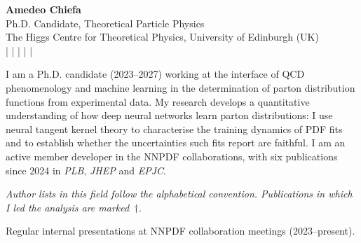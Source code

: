 \documentclass[10pt,a4paper]{article}
\begin{document}
\begin{center}
    {\LARGE \textbf{Amedeo Chiefa}} \\[0.1cm]
    {\large Ph.D. Candidate, Theoretical Particle Physics} \\
    \vspace{0.15cm}
    \small
    The Higgs Centre for Theoretical Physics, University of Edinburgh (UK) \\
    \vspace{0.15cm}
    \cvemaillink{} |
    \cvlinkedin{} |
    \cvgithub{} |
    \inspirehep{} |
    \googlescholar{} |
    \cvorcid
    \normalsize
\end{center}

\begin{cvlist}
  \item[] I am a Ph.D. candidate (2023--2027) working at the interface of QCD
          phenomenology and machine learning in the determination of parton
          distribution functions from experimental data. My research develops a
          quantitative understanding of how deep neural networks learn parton
          distributions: I use neural tangent kernel theory to characterise the
          training dynamics of PDF fits and to establish whether the
          uncertainties such fits report are faithful. I am an active member
          developer in the NNPDF collaborations, with six publications since
          2024 in \textit{PLB}, \textit{JHEP} and \textit{EPJC}.
\end{cvlist}

\begin{cvlist}
  \item[] \footnotesize \textit{Author lists in this field follow the alphabetical convention.
    Publications in which I led the analysis are marked~$\dagger$.} \normalsize
\end{cvlist}

\begin{cvlist}
\end{cvlist}

\begin{cvlist}
  \item[] Regular internal presentations at NNPDF collaboration meetings (2023--present).
\end{cvlist}
\end{document}
